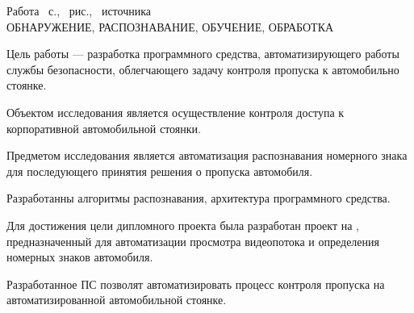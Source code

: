 \thispagestyle{empty}

Работа \pageref*{LastPage}~с., \totfig{}~рис., \totref{}~источника \\
ОБНАРУЖЕНИЕ, РАСПОЗНАВАНИЕ, ОБУЧЕНИЕ, ОБРАБОТКА

\vspace{4\parsep}

Цель работы --- разработка программного средства, автоматизирующего работы службы безопасности, облегчающего задачу контроля пропуска к автомобильно стоянке.

Объектом исследования является осуществление контроля доступа к корпоративной автомобильной стоянки.

Предметом исследования является автоматизация распознавания номерного знака для последующего принятия решения о пропуска автомобиля.

Разработанны алгоритмы распознавания, архитектура программного средства.

Для достижения цели дипломного проекта была разработан проект на \dotnet{}, предназначенный для автоматизации просмотра видеопотока и определения номерных знаков автомобиля.

Разработанное ПС позволят автоматизировать процесс контроля пропуска на автоматизированной автомобильной стоянке.

\clearpage
